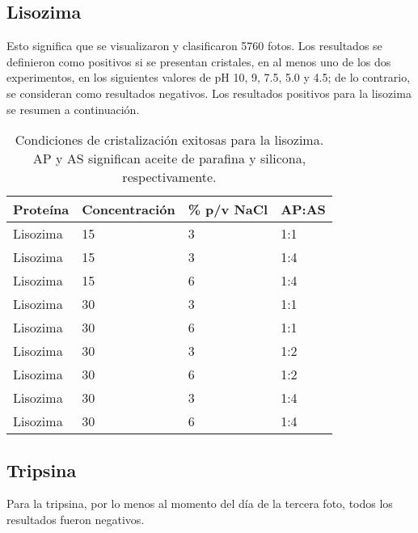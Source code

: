 \subsection{Lisozima}
Esto significa que se visualizaron y clasificaron \num{5760} fotos. Los resultados se definieron como positivos si se presentan cristales, en al menos uno de los dos experimentos, en los siguientes valores de pH 10, 9, 7.5, 5.0 y 4.5; de lo contrario, se consideran como resultados negativos. 
Los resultados positivos para la lisozima se resumen a continuación.


\begin{table}[h]
	\centering
	\begin{tabular}{@{}llll@{}}
		\toprule
		Proteína & Concentración & \% p/v NaCl & AP:AS \\ \midrule
		Lisozima & 15 & 3 & 1:1 \\
		Lisozima & 15 & 3 & 1:4 \\
		Lisozima & 15 & 6 & 1:4 \\
		Lisozima & 30 & 3 & 1:1 \\
		Lisozima & 30 & 6 & 1:1 \\
		Lisozima & 30 & 3 & 1:2 \\
		Lisozima & 30 & 6 & 1:2 \\
		Lisozima & 30 & 3 & 1:4 \\
		Lisozima & 30 & 6 & 1:4 \\ \bottomrule
	\end{tabular}
	\caption{Condiciones de cristalización exitosas para la lisozima. AP y AS significan aceite de parafina y silicona, respectivamente.}
	\label{tab:my-table}
\end{table}


\subsection{Tripsina}
Para la tripsina, por lo menos al momento del día de la tercera foto, todos los resultados fueron negativos. 

